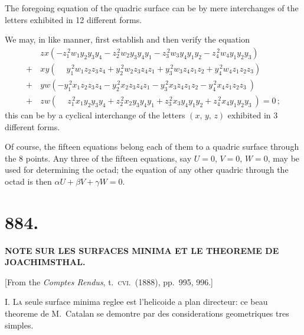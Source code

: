 \documentclass[11pt,a4paper]{book}
\begin{document}
The foregoing equation of the quadric surface can be by mere interchanges of the letters exhibited in 12 different forms.

We may, in like manner, first establish and then verify the equation
\begin{align*}
&zx(-z_1^{\,2}w_1y_2y_3y_4 - z_2^{\,2}w_2y_3y_4y_1 - z_3^{\,2}w_3y_4y_1y_2 - z_4^{\,2}w_4y_1y_2y_3) \\
+\, &xy(\phantom{-}y_1^{\,2}w_1z_2z_3z_4 + y_2^{\,2}w_2z_3z_4z_1 + y_3^{\,2}w_3z_4z_1z_2 + y_4^{\,2}w_4z_1z_2z_3) \\
+\, &yw(-y_1^{\,2}x_1z_2z_3z_4 - y_2^{\,2}x_2z_3z_4z_1 - y_3^{\,2}x_3z_4z_1z_2 - y_4^{\,2}x_4z_1z_2z_3\ ) \\
+\, &zw(\phantom{-}z_1^{\,2}x_1y_2y_3y_4 + z_2^{\,2}x_2y_3y_4y_1 + z_3^{\,2}x_3y_4y_1y_2 + z_4^{\,2}x_4y_1y_2y_3\ ) = 0\,;
\end{align*}
this can be by a cyclical interchange of the letters $(x,\, y,\, z)$ exhibited in 3 different forms.

Of course, the fifteen equations belong each of them to a quadric surface through the 8 points. Any three of the fifteen equations, say $U=0$, $V=0$, $W=0$, may be used for determining the octad; the equation of any other quadric through the octad is then $\alpha U + \beta V + \gamma W = 0$.


\newpage
\section*{884.}

\begin{center}
\textbf{NOTE SUR LES SURFACES MINIMA ET LE THEOREME DE JOACHIMSTHAL.}
\end{center}

\begin{center}
[From the \textit{Comptes Rendus}, t.\ \textsc{cvi}.\ (1888), pp.\ 995, 996.]
\end{center}

\textsc{I.} \textsc{La} seule surface minima reglee est l'helicoide a plan directeur: ce beau theoreme de M.~Catalan se demontre par des considerations geometriques tres simples.
\end{document}

